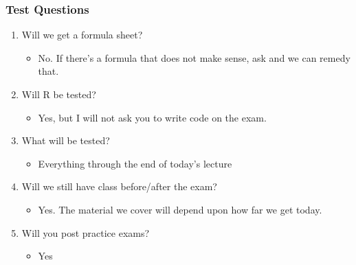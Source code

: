 \documentclass{beamer}
\begin{document}
\begin{frame}
\frametitle{Test Questions}
    \begin{enumerate}[<+- | alert@+>]
        \item Will we get a formula sheet?
            \begin{itemize}
                \item No. If there's a formula that does not make sense, ask and we can remedy that.
            \end{itemize}
       \item Will R be tested?
       	\begin{itemize}
       		\item Yes, but I will not ask you to write code on the exam. 
       	\end{itemize}
        \item What will be tested?
            \begin{itemize}
                \item Everything through the end of today's lecture
            \end{itemize}
        \item Will we still have class before/after the exam?
        		\begin{itemize}
        			\item Yes. The material we cover will depend upon how far we get today. 
        		\end{itemize}
        	\item Will you post practice exams?
        		\begin{itemize}
        			\item Yes
        		\end{itemize}
    \end{enumerate}
\end{frame} 
\end{document}
